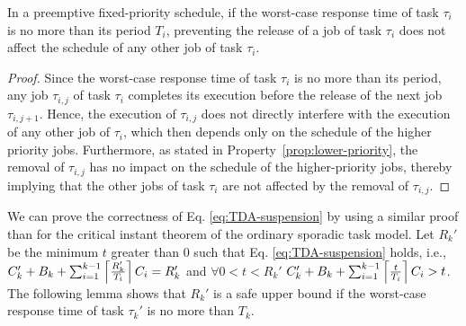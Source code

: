\begin{Lemma}
\label{lemma:remove-same-task}
In a preemptive fixed-priority schedule, if the worst-case response time of task $\tau_i$ is no more than its period $T_i$, preventing the release of a job of task $\tau_i$ does not affect the schedule of any other job of task $\tau_i$.
\end{Lemma}
\begin{proof}
Since the worst-case response time of task $\tau_i$ is no more than its period, any job $\tau_{i,j}$ of task $\tau_i$ completes its execution before the release of the next job $\tau_{i,j+1}$. Hence, the execution of $\tau_{i,j}$ does not directly interfere with the execution of any other job of $\tau_i$, which then depends only on the schedule of the higher priority jobs. Furthermore, as stated in Property~\ref{prop:lower-priority}, the removal of $\tau_{i,j}$ has no impact on the schedule of the higher-priority jobs, thereby implying that the other jobs of task $\tau_i$ are not affected by the removal of $\tau_{i,j}$.
\end{proof}

We can prove the correctness of Eq. \eqref{eq:TDA-suspension} by using a similar proof than for the critical instant theorem of the ordinary sporadic task model.
Let $R_k'$ be the minimum $t$ greater than $0$ such that  Eq. \eqref{eq:TDA-suspension} holds, i.e., $C'_k + B_k + \sum_{i=1}^{k-1}\left\lceil{\frac{R_k'}{T_i}}\right\rceil C_i = R_k'$ and $\forall 0 < t < R_k'$ $C'_k + B_k + \sum_{i=1}^{k-1}\left\lceil{\frac{t}{T_i}}\right\rceil C_i > t$. The following lemma shows that $R_k'$ is a safe upper bound if the worst-case response time of task $\tau_k'$ is no more than $T_k$.

